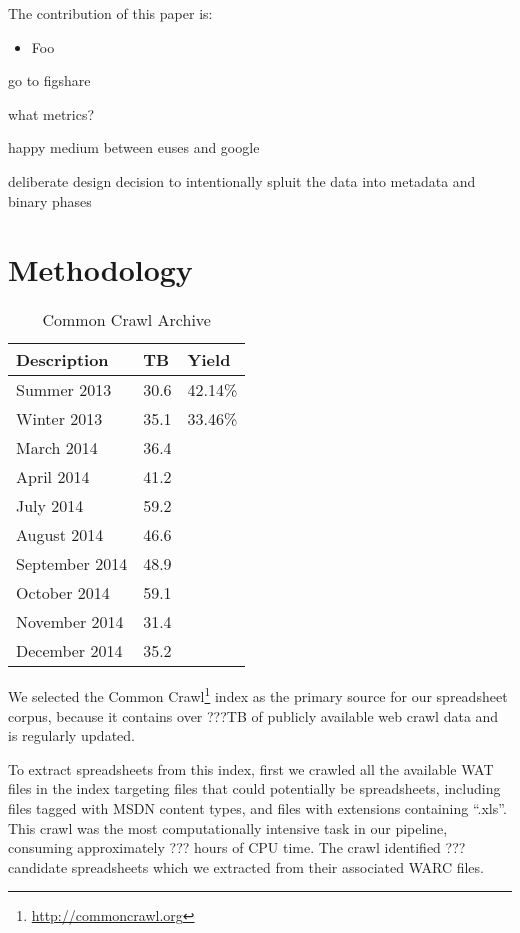 \documentclass[conference]{IEEEtran}
\begin{document}
The contribution of this paper is:

\begin{itemize}
\item Foo
\end{itemize}

go to figshare


what metrics?

happy medium between euses and google

deliberate design decision to 
intentionally spluit the data into metadata and binary phases

\section{Methodology}

\begin{table}[!t]
\caption{Common Crawl Archive\label{tab:ccrawl}}
\centering
\begin{tabular}{lll}
\toprule
Description & TB & Yield\\
\midrule
Summer 2013 & 30.6 & 42.14\%\\
Winter 2013 & 35.1 & 33.46\% \\
March 2014 & 36.4 & \\
April 2014 & 41.2 & \\
July 2014 & 59.2 & \\
August 2014 & 46.6 & \\
September 2014 & 48.9 & \\
October 2014 & 59.1 & \\
November 2014 & 31.4 & \\
December 2014 & 35.2 & \\
\bottomrule
\end{tabular}
\end{table}


We selected the Common Crawl\footnote{\url{http://commoncrawl.org}} index as the primary source for our spreadsheet corpus, because it contains over ???TB of publicly available web crawl data and is regularly updated.

To extract spreadsheets from this index, first we crawled all the available WAT files in the index targeting files that could potentially be spreadsheets, including files tagged with MSDN content types, and files with extensions containing ``.xls''. 
This crawl was the most computationally intensive task in our pipeline, consuming approximately ??? hours of CPU time. 
The crawl identified ??? candidate spreadsheets which we extracted from their associated WARC files. 
\end{document}
